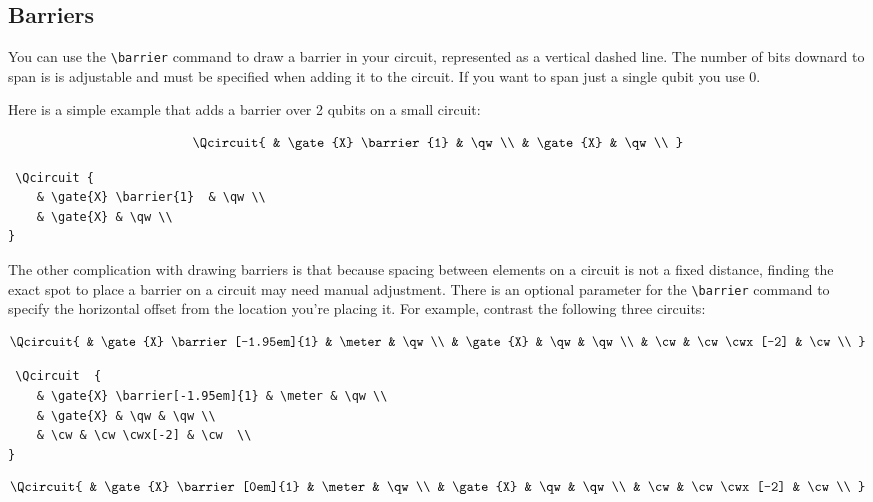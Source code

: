 \documentclass[twocolumn,nofootinbib]{revtex4}
\begin{document}
\subsection{Barriers}

You can use the \verb=\barrier= command to draw a barrier in your circuit, represented as a vertical dashed line.
The number of bits downard to span is is adjustable and must be specified when adding it to
the circuit. If you want to span just a single qubit you use 0.

Here is a simple example that adds a barrier over 2 qubits on a small
circuit:

\[ \Qcircuit {
    & \gate{X} \barrier{1} & \qw \\
    & \gate{X} & \qw \\
}\]

{\small \begin{verbatim} \Qcircuit {
    & \gate{X} \barrier{1}  & \qw \\
    & \gate{X} & \qw \\
}\end{verbatim}}


The other complication with drawing barriers is that because spacing between
elements on a circuit is not a fixed distance, finding the exact spot to place
a barrier on a circuit may need manual adjustment. There is an optional
parameter for the \verb=\barrier= command to specify the horizontal offset from
the location you're placing it. For example, contrast the following three circuits:

\[ \Qcircuit {
    & \gate{X} \barrier[-1.95em]{1} & \meter & \qw \\
    & \gate{X} & \qw & \qw \\
    & \cw & \cw \cwx[-2] & \cw \\
}\]

{\small \begin{verbatim} \Qcircuit  {
    & \gate{X} \barrier[-1.95em]{1} & \meter & \qw \\
    & \gate{X} & \qw & \qw \\
    & \cw & \cw \cwx[-2] & \cw  \\
}\end{verbatim}}
 

\[ \Qcircuit {
    & \gate{X} \barrier[0em]{1} & \meter & \qw \\
    & \gate{X} & \qw & \qw \\
    & \cw & \cw \cwx[-2] & \cw \\
}\]
\end{document}
